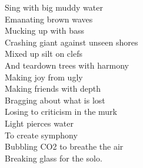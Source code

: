 Sing with big muddy water \\
Emanating brown waves \\
Mucking up with bass \\
Crashing giant against unseen shores \\
Mixed up silt on clefs \\
And teardown trees with harmony \\
Making joy from ugly \\
Making friends with depth \\
Bragging about what is lost \\
Losing to criticism in the murk \\
Light pierces water \\
To create symphony \\
Bubbling CO2 to breathe the air \\
Breaking glass for the solo. \\

